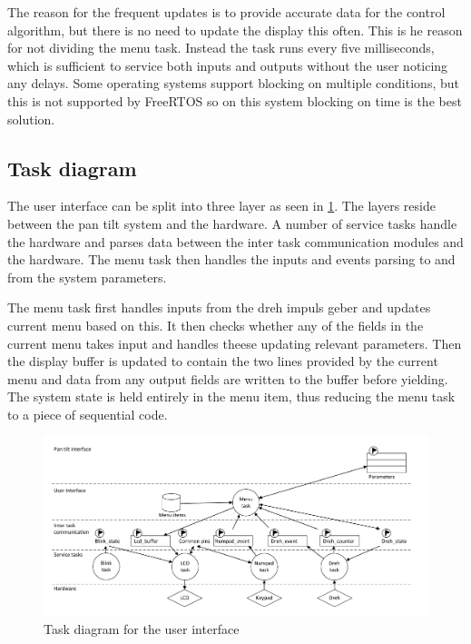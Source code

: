 The reason for the frequent updates is to provide accurate data for the control algorithm, but there is no need to update the display this often. This is he reason for not dividing the menu task. Instead the task runs every five milliseconds, which is sufficient to service both inputs and outputs without the user noticing any delays. Some operating systems support blocking on multiple conditions, but this is not supported by FreeRTOS so on this system blocking on time is the best solution.

\subsection{Task diagram}
The user interface can be split into three layer as seen in \ref{fig:ui_task_diagram}. The layers reside between the pan tilt system and the hardware. A number of service tasks handle the hardware and parses data between the inter task communication modules and the hardware. The menu task then handles the inputs and events parsing to and from the system parameters.

The menu task first handles inputs from the dreh impuls geber and updates current menu based on this. It then checks whether any of the fields in the current menu takes input and handles theese updating relevant parameters. Then the display buffer is updated to contain the two lines provided by the current menu and data from any output fields are written to the buffer before yielding. The system state is held entirely in the menu item, thus reducing the menu task to a piece of sequential code.

\begin{figure}[htb]
	\centering
	\includegraphics[width=\textwidth,trim=0 0 0 0]{graphics/task_diagram_user_interface.pdf} 
	\caption{Task diagram for the user interface}
	\label{fig:ui_task_diagram}
\end{figure}

